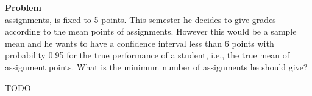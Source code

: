\documentclass[12pt]{article}
\newenvironment{Ex}{\textbf{Problem}\vspace{.75em}\\}{}
\begin{document}
\begin{enumerate}
\begin{Ex}
    assignments, is fixed to 5 points. This semester he decides to
    give grades according to the mean points of assignments. However
    this would be a sample mean and he wants to have a confidence
    interval less than 6 points with probability 0.95 for the true
    performance of a student, i.e., the true mean of assignment
    points. What is the minimum number of assignments he should give?
    \begin{solution} \hfill
      {\huge \color{red} TODO}
    \end{solution}
  \end{Ex}
\end{enumerate}
\end{document}
